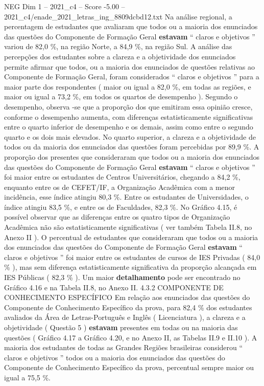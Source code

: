 \begin{textsample}{NEG Dim 1 – 2021\_c4 – Score -5.00 – 2021\_c4/enade\_2021\_letras\_ing\_8809dcbd12.txt}
Na análise regional, a percentagem de estudantes que avaliaram que todos ou a maioria dos enunciados das questões do Componente de Formação Geral \textbf{estavam} “ claros e objetivos ” variou de 82,0 \%, na região Norte, a 84,9 \%, na região Sul.
A análise das percepções dos estudantes sobre a clareza e a objetividade dos enunciados permite afirmar que todos, ou a maioria dos enunciados de questões relativas ao Componente de Formação Geral, foram considerados “ claros e objetivos ” para a maior parte dos respondentes ( maior ou igual a 82,0 \%, em todas as regiões, e maior ou igual a 73,2 \%, em todos os quartos de desempenho ).
Segundo o desempenho, observa -se que a proporção dos que emitiram essa opinião cresce, conforme o desempenho aumenta, com diferenças estatisticamente significativas entre o quarto inferior de desempenho e os demais, assim como entre o segundo quarto e os dois mais elevados.
No quarto superior, a clareza e a objetividade de todos ou da maioria dos enunciados das questões foram percebidas por 89,9 \%.
A proporção dos presentes que consideraram que todos ou a maioria dos enunciados das questões do Componente de Formação Geral \textbf{estavam} “ claros e objetivos ” foi maior entre os estudantes de Centros Universitários, chegando a 84,2 \%, enquanto entre os de CEFET/IF, a Organização Acadêmica com a menor incidência, esse índice atingiu 80,3 \%.
Entre os estudantes de Universidades, o índice atingiu 83,5 \%, e entre os de Faculdades, 82,3 \%.
No Gráfico 4.15, é possível observar que as diferenças entre os quatro tipos de Organização Acadêmica não são estatisticamente significativas ( ver também Tabela II.8, no Anexo II ).
O percentual de estudantes que consideraram que todos ou a maioria dos enunciados das questões do Componente de Formação Geral \textbf{estavam} “ claros e objetivos ” foi maior entre os estudantes de cursos de IES Privadas ( 84,0 \% ), mas sem diferença estatisticamente significativa da proporção alcançada em IES Públicas ( 82,3 \% ).
Um maior \textbf{detalhamento} pode ser encontrado no Gráfico 4.16 e na Tabela II.8, no Anexo II. 4.3.2 COMPONENTE DE CONHECIMENTO ESPECÍFICO Em relação aos enunciados das questões do Componente de Conhecimento Específico da prova, para 82,4 \% dos estudantes avaliados da Área de Letras-Português e Inglês ( Licenciatura ), a clareza e a objetividade ( Questão 5 ) \textbf{estavam} presentes em todas ou na maioria das questões ( Gráfico 4.17 a Gráfico 4.20, e no Anexo II, as Tabelas II.9 e II.10 ).
A maioria dos estudantes de todas as Grandes Regiões brasileiras considerou “ claros e objetivos ” todos ou a maioria dos enunciados das questões do Componente de Conhecimento Específico da prova, percentual sempre maior ou igual a 75,5 \%.

\end{textsample}
